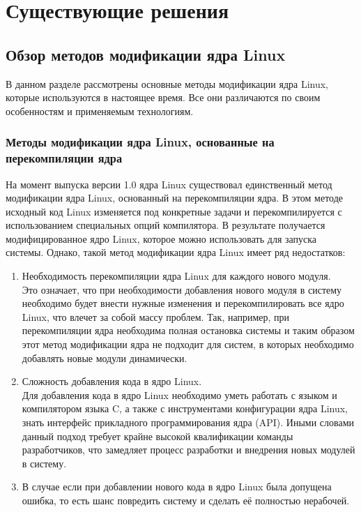 \chapter{Существующие решения}\label{ch:--}
\section{Обзор методов модификации ядра Linux}\label{sec:----linux}

В данном разделе рассмотрены основные методы модификации ядра Linux, которые используются в настоящее время.
Все они различаются по своим особенностям и применяемым технологиям.

\subsection{Методы модификации ядра Linux, основанные на перекомпиляции ядра}\label{subsec:---linux----}

На момент выпуска версии 1.0 ядра Linux существовал единственный метод модификации ядра Linux, основанный на перекомпиляции ядра.
В этом методе исходный код Linux изменяется под конкретные задачи и перекомпилируется с использованием специальных опций компилятора.
В результате получается модифицированное ядро Linux, которое можно использовать для запуска системы.
Однако, такой метод модификации ядра Linux имеет ряд недостатков:
\begin{enumerate}
    \item Необходимость перекомпиляции ядра Linux для каждого нового модуля. \vspace{1mm}\\
    Это означает, что при необходимости добавления нового модуля в систему необходимо будет внести нужные изменения и перекомпилировать все ядро Linux, что влечет за собой массу проблем.
    Так, например, при перекомпиляции ядра необходима полная остановка системы и таким образом этот метод модификации ядра не подходит для систем, в которых необходимо добавлять новые модули динамически.

    \item Сложность добавления кода в ядро Linux. \vspace{1mm}\\
    Для добавления кода в ядро Linux необходимо уметь работать с языком и компилятором языка C, а также с инструментами конфигурации ядра Linux, знать интерфейс прикладного программирования ядра (API)\cite{API-linux}.
    Иными словами данный подход требует крайне высокой квалификации команды разработчиков, что замедляет процесс разработки и внедрения новых модулей в систему.
    \item В случае если при добавлении нового кода в ядро Linux была допущена ошибка, то есть шанс повредить систему и сделать её полностью нерабочей.
\end{enumerate}

